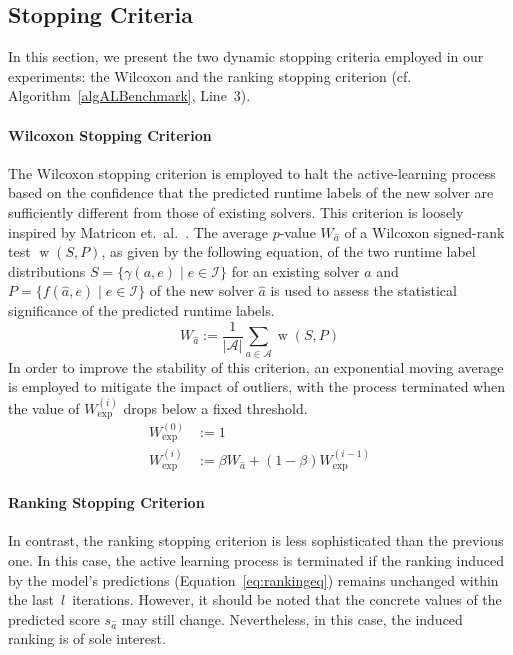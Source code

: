 \documentclass[sn-basic, Numbered]{sn-jnl} %
\begin{document}
\subsection{Stopping Criteria}
\label{sec:main:stopping}

In this section, we present the two dynamic stopping criteria employed in our experiments: the Wilcoxon and the ranking stopping criterion (cf. Algorithm~\ref{algALBenchmark}, Line~3).

\paragraph{Wilcoxon Stopping Criterion}

The Wilcoxon stopping criterion is employed to halt the active-learning process based on the confidence that the predicted runtime labels of the new solver are sufficiently different from those of existing solvers.
This criterion is loosely inspired by Matricon et.~al.~\cite{MatriconAFSH21}.
The average $p$-value $W_{\hat{a}}$ of a Wilcoxon signed-rank test $\operatorname{w}(S,P)$, as given by the following equation, of the two runtime label distributions ${S=\{ \gamma(a, e) \mid e \in \mathcal{I} \}}$ for an existing solver $a$ and \mbox{$P=\{ f(\hat a, e) \mid e \in \mathcal{I} \}$} of the new solver $\hat{a}$ is used to assess the statistical significance of the predicted runtime labels.
%
\begin{equation*}
  W_{\hat{a}} := \frac{1}{\lvert \mathcal{A} \rvert} \sum_{a \in \mathcal{A}} \operatorname{w}(S, P)
\end{equation*}
%
In order to improve the stability of this criterion, an exponential moving average is employed to mitigate the impact of outliers, with the process terminated when the value of $W^{(i)}_{\exp}$ drops below a fixed threshold.
%
\begin{align*}
  W_{\exp}^{\left(0\right)} &:= 1\\
  W_{\exp}^{\left(i\right)} &:= \beta W_{\hat{a}} + \left(1 - \beta\right) W_{\exp}^{\left(i - 1\right)}
\end{align*}

\paragraph{Ranking Stopping Criterion}

In contrast, the ranking stopping criterion is less sophisticated than the previous one.
In this case, the active learning process is terminated if the ranking induced by the model's predictions (Equation~\eqref{eq:rankingeq}) remains unchanged within the last~$l$~iterations.
However, it should be noted that the concrete values of the predicted score $s_{\hat a}$ may still change.
Nevertheless, in this case, the induced ranking is of sole interest.
\end{document}
